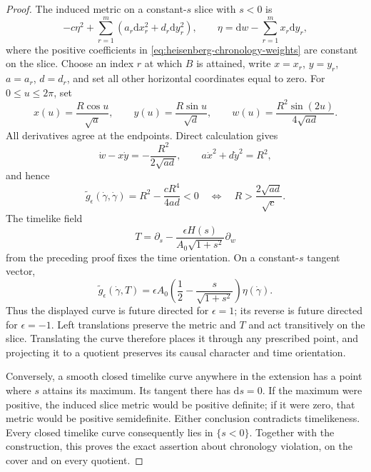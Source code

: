 \documentclass[10pt,a4paper]{article}
\numberwithin{equation}{section}
\theoremstyle{definition}
\theoremstyle{remark}
\newcommand{\dd}{\mathrm d}
\begin{document}
\begin{proof}
The induced metric on a constant-$s$ slice with $s<0$ is
\begin{equation}
 -c\eta^2+\sum_{r=1}^m(a_r\dd x_r^2+d_r\dd y_r^2),
 \qquad \eta=\dd w-\sum_{r=1}^m x_r\dd y_r,
 \label{eq:heisenberg-chronology-slice}
\end{equation}
where the positive coefficients in
\eqref{eq:heisenberg-chronology-weights} are constant on the slice.
Choose an index $r$ at which $B$ is attained, write
$x=x_r$, $y=y_r$, $a=a_r$, $d=d_r$, and set all other horizontal
coordinates equal to zero.  For $0\le u\le2\pi$, set
\begin{equation}
 x(u)=\frac{R\cos u}{\sqrt a},\qquad
 y(u)=\frac{R\sin u}{\sqrt d},\qquad
 w(u)=\frac{R^2\sin(2u)}{4\sqrt{ad}}.
 \label{eq:heisenberg-chronology-loop}
\end{equation}
All derivatives agree at the endpoints.  Direct calculation gives
\[
 \dot w-x\dot y=-\frac{R^2}{2\sqrt{ad}},\qquad
 a\dot x^2+d\dot y^2=R^2,
\]
and hence
\begin{equation}
 \widetilde g_\epsilon(\dot\gamma,\dot\gamma)
 =R^2-\frac{cR^4}{4ad}<0
 \quad\Longleftrightarrow\quad
 R>\frac{2\sqrt{ad}}{\sqrt c}.
 \label{eq:heisenberg-chronology-threshold}
\end{equation}
The timelike field
\[
 T=\partial_s-
 \frac{\epsilon H(s)}{A_0\sqrt{1+s^2}}\partial_w
\]
from the preceding proof fixes the time orientation.  On a
constant-$s$ tangent vector,
\[
 \widetilde g_\epsilon(\dot\gamma,T)
 =\epsilon A_0\left(\frac12-
              \frac{s}{\sqrt{1+s^2}}\right)\eta(\dot\gamma).
\]
Thus the displayed curve is future directed for $\epsilon=1$;
its reverse is future directed for $\epsilon=-1$.
Left translations preserve the metric and $T$ and act transitively
on the slice.  Translating the curve therefore places it through
any prescribed point, and projecting it to a quotient preserves
its causal character and time orientation.

Conversely, a smooth closed timelike curve anywhere in the extension
has a point where $s$ attains its maximum.  Its tangent there has
$\dd s=0$.  If the maximum were positive, the induced slice metric
would be positive definite; if it were zero, that metric would be
positive semidefinite.  Either conclusion contradicts timelikeness.
Every closed timelike curve consequently lies in $\{s<0\}$.
Together with the construction, this proves the exact assertion
about chronology violation, on the cover and on every quotient.


\end{proof}
\end{document}
